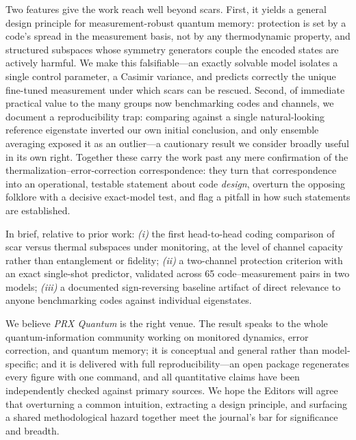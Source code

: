 \documentclass[11pt]{article}
\begin{document}
Two features give the work reach well beyond scars. First, it yields a general
design principle for measurement-robust quantum memory: protection is set by a
code's spread in the measurement basis, not by any thermodynamic property, and
structured subspaces whose symmetry generators couple the encoded states are
actively harmful. We make this falsifiable---an exactly solvable model isolates a
single control parameter, a Casimir variance, and predicts correctly the unique
fine-tuned measurement under which scars can be rescued. Second, of immediate
practical value to the many groups now benchmarking codes and channels, we
document a reproducibility trap: comparing against a single natural-looking
reference eigenstate inverted our own initial conclusion, and only ensemble
averaging exposed it as an outlier---a cautionary result we consider broadly
useful in its own right. Together these carry the work past any mere confirmation
of the thermalization--error-correction correspondence: they turn that
correspondence into an operational, testable statement about code \emph{design},
overturn the opposing folklore with a decisive exact-model test, and flag a
pitfall in how such statements are established.

\noindent In brief, relative to prior work: \emph{(i)} the first head-to-head
coding comparison of scar versus thermal subspaces under monitoring, at the
level of channel capacity rather than entanglement or fidelity; \emph{(ii)} a
two-channel protection criterion with an exact single-shot predictor, validated
across 65 code--measurement pairs in two models; \emph{(iii)} a documented
sign-reversing baseline artifact of direct relevance to anyone benchmarking
codes against individual eigenstates.

\vspace{0.5em}

We believe \emph{PRX Quantum} is the right venue. The result speaks to the whole
quantum-information community working on monitored dynamics, error correction,
and quantum memory; it is conceptual and general rather than model-specific; and
it is delivered with full reproducibility---an open package regenerates every
figure with one command, and all quantitative claims have been independently
checked against primary sources. We hope the Editors will agree that overturning
a common intuition, extracting a design principle, and surfacing a shared
methodological hazard together meet the journal's bar for significance and
breadth.
\end{document}

